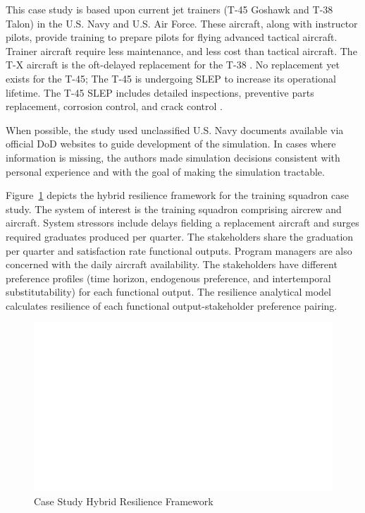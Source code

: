 \documentclass[preprint,12pt]{elsarticle}
\begin{document}
This case study is based upon current jet trainers (T-45 Goshawk and
T-38 Talon) in the U.S. Navy and U.S. Air Force. These aircraft, along
with instructor pilots, provide training to prepare pilots for flying advanced tactical
aircraft. Trainer aircraft require less maintenance, and less cost
than tactical aircraft. The T-X aircraft is the
oft-delayed replacement for the T-38 \cite{Mehta2013}. No replacement
yet exists for the T-45; The T-45 is undergoing SLEP to increase its operational
lifetime. The T-45 SLEP includes detailed inspections, preventive parts 
replacement, corrosion control, and crack control \cite{jennings2018}.

When possible, the study used unclassified U.S. Navy documents
available via official DoD websites to guide development of the
simulation. In cases where information is missing, the authors made
simulation decisions consistent with personal experience and with the
goal of making the simulation tractable.

Figure~\ref{f:FleetFramework} depicts the hybrid resilience framework
for the training squadron case study. The system of interest is the
training squadron comprising aircrew and aircraft. System stressors
include delays fielding a replacement aircraft and surges required
graduates produced per quarter. The stakeholders share the graduation
per quarter and satisfaction rate functional outputs. Program managers
are also concerned with the daily aircraft availability. The
stakeholders have different preference profiles (time horizon,
endogenous preference, and intertemporal substitutability) for each
functional output. The resilience analytical model calculates
resilience of each functional output-stakeholder preference pairing.

\begin{landscape}
\begin{figure}[h]
  \centering\includegraphics[width=8in]{CaseStudyHRF.pdf}
  \caption{Case Study Hybrid Resilience Framework}
  \label{f:FleetFramework}
\end{figure}
\end{landscape}
\end{document}
